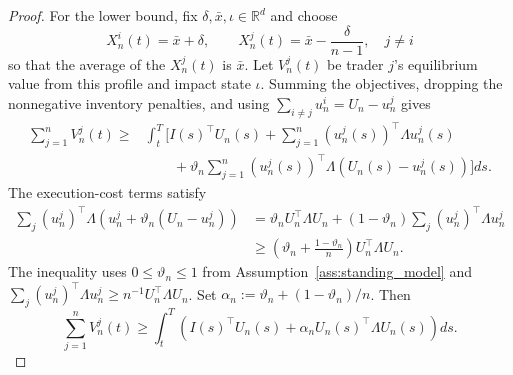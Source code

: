 \documentclass[12pt]{article}
\numberwithin{equation}{section}
\theoremstyle{definition}
\begin{document}
\begin{proof}
For the lower bound, fix \(\delta,\bar x,\iota\in\mathbb R^d\) and choose
\[
X_n^i(t)=\bar x+\delta,
\qquad
X_n^j(t)=\bar x-\frac{\delta}{n-1},
\quad j\ne i
\]
so that the average of the \(X^j_n(t)\) is \(\bar x\).  Let \(V_n^j(t)\) be trader \(j\)'s equilibrium
value from this profile and impact state \(\iota\).  Summing the objectives,
dropping the nonnegative inventory penalties, and using
\(\sum_{i\ne j}u_n^i=U_n-u_n^j\) gives
\[
\begin{aligned}
\sum_{j=1}^nV_n^j(t)
\geq{}&\int_t^T\Bigg[
I(s)^\top U_n(s)
+\sum_{j=1}^n(u_n^j(s))^\top\Lambda u_n^j(s)
\\
&\qquad
+\vartheta_n\sum_{j=1}^n
(u_n^j(s))^\top\Lambda(U_n(s)-u_n^j(s))
\Bigg]ds.
\end{aligned}
\]
The execution-cost terms satisfy
\[
\begin{aligned}
\sum_j(u_n^j)^\top\Lambda
\left(u_n^j+\vartheta_n(U_n-u_n^j)\right)
&=\vartheta_nU_n^\top\Lambda U_n
+(1-\vartheta_n)\sum_j(u_n^j)^\top\Lambda u_n^j
\\
&\geq
\left(\vartheta_n+\frac{1-\vartheta_n}{n}\right)
U_n^\top\Lambda U_n.
\end{aligned}
\]
The inequality uses \(0\leq\vartheta_n\leq1\) from
Assumption~\ref{ass:standing_model} and
\(\sum_j(u_n^j)^\top\Lambda u_n^j\geq n^{-1}U_n^\top\Lambda U_n\).  Set
\(\alpha_n:=\vartheta_n+(1-\vartheta_n)/n\).  Then
\begin{equation}
\label{eq:uniform_solvability_aggregate_execution_bound}
\sum_{j=1}^nV_n^j(t)
\geq
\int_t^T\left(
I(s)^\top U_n(s)+\alpha_nU_n(s)^\top\Lambda U_n(s)
\right)ds.
\end{equation}


\end{proof}
\end{document}
